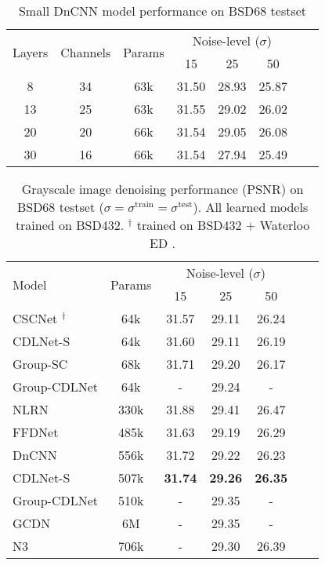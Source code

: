 \documentclass[12pt,a4paper,leqno]{amsart}
\author{Nikola Janju\v{s}evi\'{c}}
\date{\today}
\begin{document}
\begin{table}
\centering
\caption{Small DnCNN model performance on BSD68 testset}
\begin{tabular}{cccccccc} \hline
\multirow{2}{*}{Layers} & \multirow{2}{*}{Channels} & \multirow{2}{*}{Params}&\multicolumn{3}{c}{Noise-level ($\sigma$)} \\
   &    &     & 15    & 25    & 50 \\ \hline
8  & 34 & 63k & 31.50 & 28.93 & 25.87 \\
13 & 25 & 63k & 31.55 & 29.02 & 26.02 \\
20 & 20 & 66k & 31.54 & 29.05 & 26.08 \\
30 & 16 & 66k & 31.54 & 27.94 & 25.49 \\\hline
\end{tabular}
\end{table}



\begin{table}
\centering
\caption{Grayscale image denoising performance (PSNR) on BSD68 testset ($\sigma
= \sigma^{\mathrm{train}} = \sigma^{\mathrm{test}}$). All learned models
trained on BSD432\cite{bsd}. $^\dagger$ trained on BSD432 $+$ Waterloo ED
\cite{ma2017waterloo}.}
\begin{tabular}{lcccccc} \hline
\multirow{2}{*}{Model} & \multirow{2}{*}{Params} & \multicolumn{3}{c}{Noise-level ($\sigma$)} \\
 & & 15 & 25 & 50 \\ \hline
CSCNet \cite{Simon2019}$^\dagger$ & 64k & 31.57 & 29.11 & 26.24 \\
CDLNet-S \cite{janjuvsevic2021cdlnet} & 64k & 31.60 & 29.11 & 26.19 \\
Group-SC \cite{mairal} & 68k & 31.71 & 29.20 & 26.17 \\ 
Group-CDLNet & 64k & - & 29.24 &  - \\\hline
NLRN                 & 330k& 31.88 & 29.41 & 26.47 \\
FFDNet \cite{FFDNet} & 485k& 31.63 & 29.19 & 26.29 \\
DnCNN \cite{DnCNN} & 556k& 31.72& 29.22 & 26.23 \\
CDLNet-S \cite{janjuvsevic2021cdlnet} & 507k& \bf{31.74} & \bf{29.26} & \bf{26.35} \\
Group-CDLNet & 510k & - & 29.35 &  - \\
GCDN & 6M & - & 29.35 &  - \\
N3 & 706k & - & 29.30 & 26.39 \\\hline
\end{tabular}
\end{table}
\end{document}
